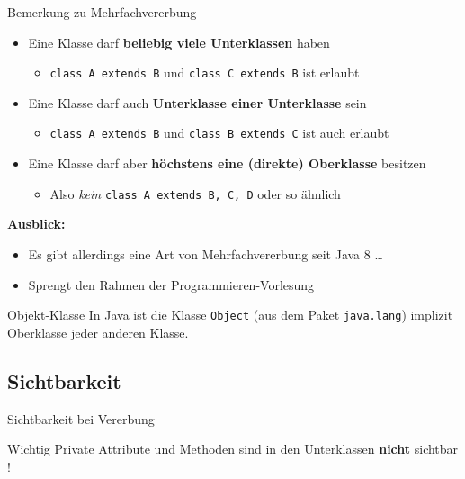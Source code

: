 \documentclass[18pt]{beamer}
\begin{document}
\begin{frame}{Bemerkung zu Mehrfachvererbung}
    \begin{itemize}
        \item Eine Klasse darf \textbf{beliebig viele Unterklassen} haben
        \begin{itemize}
            \item \texttt{class A extends B} und \texttt{class C extends B} ist erlaubt
        \end{itemize}
        \item Eine Klasse darf auch \textbf{Unterklasse einer Unterklasse} sein
        \begin{itemize}
            \item \texttt{class A extends B} und \texttt{class B extends C} ist auch erlaubt
        \end{itemize}
        \item Eine Klasse darf aber \textbf{höchstens eine (direkte) Oberklasse} besitzen
        \begin{itemize}
            \item Also \textit{kein} \texttt{class A extends B, C, D} oder so ähnlich
        \end{itemize}
    \end{itemize}
    \vspace{.4in}
    \pause
    \textbf{Ausblick:}
    \begin{itemize}
        \item Es gibt allerdings eine Art von Mehrfachvererbung seit Java 8 \dots
        \item Sprengt den Rahmen der Programmieren-Vorlesung
    \end{itemize}
\end{frame}

\begin{frame}{Objekt-Klasse}
    In Java ist die Klasse \texttt{Object} (aus dem Paket \texttt{java.lang}) implizit Oberklasse jeder anderen Klasse.
\end{frame}


\subsection{Sichtbarkeit}

\begin{frame}{Sichtbarkeit bei Vererbung}
    \begin{alertblock}{Wichtig}
        Private Attribute und Methoden sind in den Unterklassen \textbf{nicht} sichtbar !
    \end{alertblock}

\end{frame}
\end{document}
